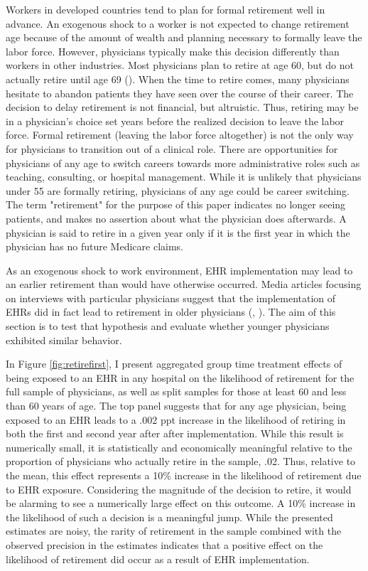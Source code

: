 \documentclass[11pt]{article}
\begin{document}
Workers in developed countries tend to plan for formal retirement well in advance. An exogenous shock to a worker is not expected to change retirement age because of the amount of wealth and planning necessary to formally leave the labor force. However, physicians typically make this decision differently than workers in other industries. Most physicians plan to retire at age 60, but do not actually retire until age 69 (\cite{collier2017challenges}). When the time to retire comes, many physicians hesitate to abandon patients they have seen over the course of their career. The decision to delay retirement is not financial, but altruistic. Thus, retiring may be in a physician's choice set years before the realized decision to leave the labor force. Formal retirement (leaving the labor force altogether) is not the only way for physicians to transition out of a clinical role. There are opportunities for physicians of any age to switch careers towards more administrative roles such as teaching, consulting, or hospital management. While it is unlikely that physicians under 55 are formally retiring, physicians of any age could be career switching. The term "retirement" for the purpose of this paper indicates no longer seeing patients, and makes no assertion about what the physician does afterwards. A physician is said to retire in a given year only if it is the first year in which the physician has no future Medicare claims.

As an exogenous shock to work environment, EHR implementation may lead to an earlier retirement than would have otherwise occurred. Media articles focusing on interviews with particular physicians suggest that the implementation of EHRs did in fact lead to retirement in older physicians (\cite{ringel_2019}, \cite{loria_2020}). The aim of this section is to test that hypothesis and evaluate whether younger physicians exhibited similar behavior.

In Figure \ref{fig:retirefirst}, I present aggregated group time treatment effects of being exposed to an EHR in any hospital on the likelihood of retirement for the full sample of physicians, as well as split samples for those at least 60 and less than 60 years of age. The top panel suggests that for any age physician, being exposed to an EHR leads to a .002 ppt increase in the likelihood of retiring in both the first and second year after after implementation. While this result is numerically small, it is statistically and economically meaningful relative to the proportion of physicians who actually retire in the sample, .02. Thus, relative to the mean, this effect represents a 10\% increase in the likelihood of retirement due to EHR exposure. Considering the magnitude of the decision to retire, it would be alarming to see a numerically large effect on this outcome. A 10\% increase in the likelihood of such a decision is a meaningful jump. While the presented estimates are noisy, the rarity of retirement in the sample combined with the observed precision in the estimates indicates that a positive effect on the likelihood of retirement did occur as a result of EHR implementation.
\end{document}
